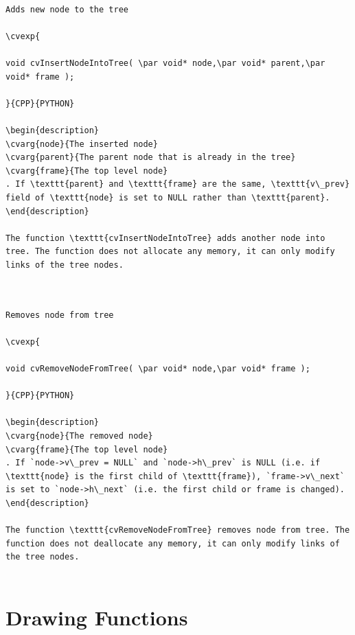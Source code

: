 \begin{verbatim}

Adds new node to the tree

\cvexp{

void cvInsertNodeIntoTree( \par void* node,\par void* parent,\par void* frame );

}{CPP}{PYTHON}

\begin{description}
\cvarg{node}{The inserted node}
\cvarg{parent}{The parent node that is already in the tree}
\cvarg{frame}{The top level node}
. If \texttt{parent} and \texttt{frame} are the same, \texttt{v\_prev} field of \texttt{node} is set to NULL rather than \texttt{parent}.
\end{description}

The function \texttt{cvInsertNodeIntoTree} adds another node into tree. The function does not allocate any memory, it can only modify links of the tree nodes.


\end{verbatim}
\label{RemoveNodeFromTree}
\begin{verbatim}

Removes node from tree

\cvexp{

void cvRemoveNodeFromTree( \par void* node,\par void* frame );

}{CPP}{PYTHON}

\begin{description}
\cvarg{node}{The removed node}
\cvarg{frame}{The top level node}
. If `node->v\_prev = NULL` and `node->h\_prev` is NULL (i.e. if \texttt{node} is the first child of \texttt{frame}), `frame->v\_next` is set to `node->h\_next` (i.e. the first child or frame is changed).
\end{description}

The function \texttt{cvRemoveNodeFromTree} removes node from tree. The function does not deallocate any memory, it can only modify links of the tree nodes.


\end{verbatim}
\section{Drawing Functions}

